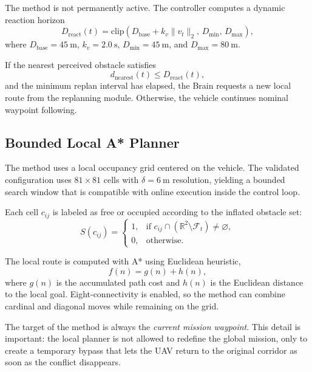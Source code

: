 \documentclass[a4paper,11pt]{article}
\begin{document}
The method is not permanently active. The controller computes a dynamic reaction horizon
\begin{equation}
    D_{\mathrm{react}}(t) =
    \mathrm{clip}\!\left(D_{\mathrm{base}} + k_v \lVert v_t \rVert_2,\,
    D_{\min},\, D_{\max}\right),
\end{equation}
where \(D_{\mathrm{base}}=\SI{45}{\meter}\), \(k_v=\SI{2.0}{\second}\), \(D_{\min}=\SI{45}{\meter}\), and \(D_{\max}=\SI{80}{\meter}\).

If the nearest perceived obstacle satisfies
\begin{equation}
    d_{\mathrm{nearest}}(t) \le D_{\mathrm{react}}(t),
\end{equation}
and the minimum replan interval has elapsed, the Brain requests a new local route from the replanning module. Otherwise, the vehicle continues nominal waypoint following.

\subsection{Bounded Local A* Planner}

The method uses a local occupancy grid centered on the vehicle. The validated configuration uses \(81 \times 81\) cells with \(\delta=\SI{6}{\meter}\) resolution, yielding a bounded search window that is compatible with online execution inside the control loop.

Each cell \(c_{ij}\) is labeled as free or occupied according to the inflated obstacle set:
\begin{equation}
    S(c_{ij}) =
    \begin{cases}
        1, & \text{if } c_{ij} \cap \left(\mathbb{R}^2 \setminus \mathcal{F}_t\right) \neq \varnothing,\\
        0, & \text{otherwise.}
    \end{cases}
\end{equation}

The local route is computed with A* \cite{hart1968formal} using Euclidean heuristic,
\begin{equation}
    f(n) = g(n) + h(n),
\end{equation}
where \(g(n)\) is the accumulated path cost and \(h(n)\) is the Euclidean distance to the local goal. Eight-connectivity is enabled, so the method can combine cardinal and diagonal moves while remaining on the grid.

The target of the method is always the \emph{current mission waypoint}. This detail is important: the local planner is not allowed to redefine the global mission, only to create a temporary bypass that lets the UAV return to the original corridor as soon as the conflict disappears.
\end{document}
